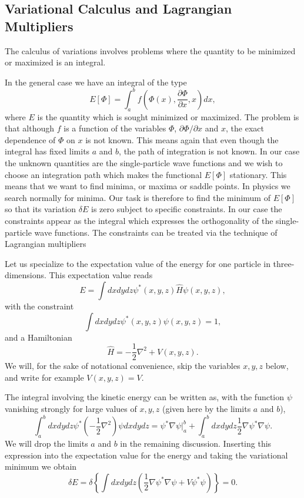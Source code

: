 \documentclass[%
oneside,                 %
final,                   %
10pt]{article}
\begin{document}
\subsection{Variational Calculus and Lagrangian Multipliers}

The calculus of variations involves 
problems where the quantity to be minimized or maximized is an integral. 

In the general case we have an integral of the type
\[ 
E[\Phi]= \int_a^b f(\Phi(x),\frac{\partial \Phi}{\partial x},x)dx,
\]
where $E$ is the quantity which is sought minimized or maximized.
The problem is that although $f$ is a function of the variables $\Phi$, $\partial \Phi/\partial x$ and $x$, the exact dependence of
$\Phi$ on $x$ is not known.  This means again that even though the integral has fixed limits $a$ and $b$, the path of integration is
not known. In our case the unknown quantities are the single-particle wave functions and we wish to choose an integration path which makes
the functional $E[\Phi]$ stationary. This means that we want to find minima, or maxima or saddle points. In physics we search normally for minima.
Our task is therefore to find the minimum of $E[\Phi]$ so that its variation $\delta E$ is zero  subject to specific
constraints. In our case the constraints appear as the integral which expresses the orthogonality of the  single-particle wave functions.
The constraints can be treated via the technique of Lagrangian multipliers

Let us specialize to the expectation value of the energy for one particle in three-dimensions.
This expectation value reads
\[
  E=\int dxdydz \psi^*(x,y,z) \hat{H} \psi(x,y,z),
\]
with the constraint
\[
 \int dxdydz \psi^*(x,y,z) \psi(x,y,z)=1,
\]
and a Hamiltonian
\[
\hat{H}=-\frac{1}{2}\nabla^2+V(x,y,z).
\]
We will, for the sake of notational convenience,  skip the variables $x,y,z$ below, and write for example $V(x,y,z)=V$.

The integral involving the kinetic energy can be written as, with the function $\psi$ vanishing
strongly for large values of $x,y,z$ (given here by the limits $a$ and $b$), 
 \[
  \int_a^b dxdydz \psi^* \left(-\frac{1}{2}\nabla^2\right) \psi dxdydz = \psi^*\nabla\psi|_a^b+\int_a^b dxdydz\frac{1}{2}\nabla\psi^*\nabla\psi.
\]
We will drop the limits $a$ and $b$ in the remaining discussion. 
Inserting this expression into the expectation value for the energy and taking the variational minimum  we obtain
\[
\delta E = \delta \left\{\int dxdydz\left( \frac{1}{2}\nabla\psi^*\nabla\psi+V\psi^*\psi\right)\right\} = 0.
\]
\end{document}
